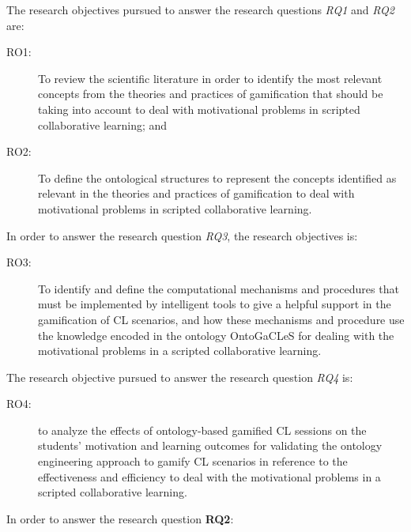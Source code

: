 The research objectives pursued to answer the research questions \emph{RQ1} and \emph{RQ2} are:

\begin{description}
\item[RO1:]
To review the scientific literature in order to identify the most relevant concepts from the theories and practices of gamification that should be taking into account to deal with motivational problems in scripted collaborative learning; and

\item[RO2:]
To define the ontological structures to represent the concepts identified as relevant in the theories and practices of gamification to deal with motivational problems in scripted collaborative learning.
\end{description}


In order to answer the research question \emph{RQ3}, the research objectives is:

\begin{description}
\item[RO3:]
To identify and define the computational mechanisms and procedures that must be implemented by intelligent tools to give a helpful support in the gamification of CL scenarios, and how these mechanisms and procedure use the knowledge encoded in the ontology OntoGaCLeS for dealing with the motivational problems in a scripted collaborative learning.
\end{description}

The research objective pursued to answer the research question \emph{RQ4} is:

\begin{description}
\item[RO4:]
to analyze the effects of ontology-based gamified CL sessions on the students’ motivation and learning outcomes for validating the ontology engineering approach to gamify CL scenarios in reference to the effectiveness and efficiency to deal with the motivational problems in a scripted collaborative learning.
\end{description}



In order to answer the research question \textbf{RQ2}: 

